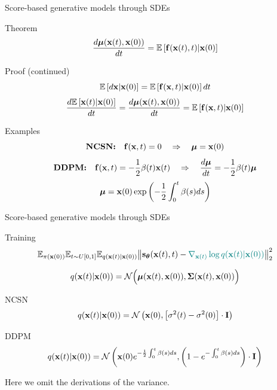 \begin{frame}{Score-based generative models through SDEs}
	\begin{block}{Theorem}
		\vspace{-0.3cm}
		\[
			\frac{d \boldsymbol{\mu}(\mathbf{x}(t), \mathbf{x}(0))}{dt} = \mathbb{E} \left[ \mathbf{f}(\mathbf{x}(t), t) | \mathbf{x}(0)\right]
		\]
		\vspace{-0.5cm}
	\end{block}
	\begin{block}{Proof (continued)}
		\vspace{-0.3cm}
		\[
			\mathbb{E}\left[d\mathbf{x} | \mathbf{x}(0) \right] = \mathbb{E}\left[\mathbf{f}(\mathbf{x}, t) | \mathbf{x}(0) \right] dt
		\]
		\[
			\frac{d \mathbb{E}\left[\mathbf{x}(t) | \mathbf{x}(0) \right]}{dt} = \frac{d \boldsymbol{\mu}(\mathbf{x}(t), \mathbf{x}(0))}{dt} = \mathbb{E}\left[\mathbf{f}(\mathbf{x}, t) | \mathbf{x}(0) \right] 
		\]
	\end{block}
	\vspace{-0.3cm}
	\begin{block}{Examples}
		\vspace{-0.5cm}
		\[
			\textbf{NCSN:} \quad	\mathbf{f}(\mathbf{x}, t) = 0 \quad \Rightarrow \quad \boldsymbol{\mu} = \mathbf{x}(0)
		\]
		\[
			\textbf{DDPM:} \quad \mathbf{f}(\mathbf{x}, t) = - \frac{1}{2} \beta(t) \mathbf{x}(t) \quad \Rightarrow \quad \frac{d \boldsymbol{\mu}}{dt} = - \frac{1}{2} \beta(t) \boldsymbol{\mu}
		\]
		\[
			\boldsymbol{\mu} = \mathbf{x}(0) \exp\left(- \frac{1}{2} \int_0^t \beta(s)ds\right)
		\]
	\end{block}
\end{frame}
\begin{frame}{Score-based generative models through SDEs}
	\begin{block}{Training}
		\vspace{-0.5cm}
		\[
			\mathbb{E}_{\pi(\mathbf{x}(0))} \mathbb{E}_{t \sim U[0, 1]} \mathbb{E}_{q(\mathbf{x}(t) | \mathbf{x}(0))}\bigl\| \mathbf{s}_{\boldsymbol{\theta}}(\mathbf{x}(t), t) - {\color{teal}\nabla_{\mathbf{x}(t)} \log q(\mathbf{x}(t) | \mathbf{x}(0))} \bigr\|^2_2 
		\]
		\vspace{-0.7cm}
	\end{block}
	\[
		q(\mathbf{x}(t) | \mathbf{x}(0)) = \mathcal{N}\Bigl(\boldsymbol{\mu}(\mathbf{x}(t), \mathbf{x}(0)), \boldsymbol{\Sigma}(\mathbf{x}(t), \mathbf{x}(0))\Bigr)
	\]
	\vspace{-0.5cm}
	\begin{block}{NCSN}
		\vspace{-0.3cm}
		\[
			q(\mathbf{x}(t) | \mathbf{x}(0)) = \mathcal{N}\left(\mathbf{x}(0), \left[\sigma^2(t) - \sigma^2(0)\right] \cdot \mathbf{I}\right)
		\]
		\vspace{-0.5cm}
	\end{block}
	\begin{block}{DDPM}
		\vspace{-0.3cm}
		\[
			q(\mathbf{x}(t) | \mathbf{x}(0)) = \mathcal{N}\left(\mathbf{x}(0) e^{-\frac{1}{2} \int_0^t\beta(s)ds}, \left(1 - e^{- \int_0^t\beta(s)ds}\right) \cdot \mathbf{I}\right)
		\]
		\vspace{-0.5cm}
	\end{block}
	Here we omit the derivations of the variance.
	
\end{frame}
